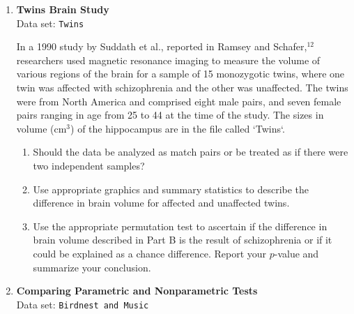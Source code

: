 \documentclass[
]{report}
\begin{document}
\begin{enumerate}
\begin{enumerate}
  \item Moore suspected that closed nests tend to be built by larger birds, but here we will treat the alternative as two-sided, since her suspicion was based on scanty evidence. Use comparative dotplots or boxplots and summary statistics to describe the relationship between average body length and nest type (the `Closed` variable). (Note: `Closed` = 1 for closed nests; `Closed` = 0 for open nests.) Does it appear that Moore’s initial suspicion is borne out by the data?
    \item Run a permutation test using a two-sided alternative to determine if type of nest varies by body length and interpret your results. Be sure to state your conclusions in the context of the problem and address how random allocation and random sampling (or lack of either) impact your conclusions.
  \end{enumerate}
  
  
  \item \textbf{Twins Brain Study} \\
  Data set: \texttt{Twins} 
  
  In a 1990 study by Suddath et al., reported in Ramsey and Schafer,$^{12}$ researchers used magnetic resonance imaging to measure the volume of various regions of the brain for a sample of 15 monozygotic twins, where one twin was affected with schizophrenia and the other was unaffected. The twins were from North America and comprised eight male pairs, and seven female pairs ranging
in age from 25 to 44 at the time of the study. The sizes in volume (cm$^3$) of the hippocampus are in the file called `Twins`.
  \begin{enumerate}
      
    \item Should the data be analyzed as match pairs or be treated as if there were two independent
samples?
    \item Use appropriate graphics and summary statistics to describe the difference in brain volume for
affected and unaffected twins.
    \item Use the appropriate permutation test to ascertain if the difference in brain volume described in
Part B is the result of schizophrenia or if it could be explained as a chance difference. Report
your $\scriptstyle p$-value and summarize your conclusion.
  \end{enumerate}
  
  
  \item \textbf{Comparing Parametric and Nonparametric Tests} \\
  Data set: \texttt{Birdnest and Music}
  \begin{enumerate}
      

\end{enumerate}
\end{enumerate}
\end{document}
